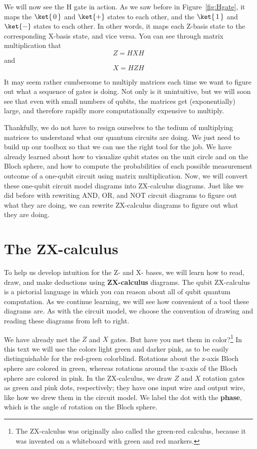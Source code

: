 \documentclass{article}
\theoremstyle{definition}
\newcommand{\kz}[1]{\ket{\,#1\,}}
\newcommand{\kx}[1]{\ket{#1}}
\begin{document}
We will now see the H gate in action.  As we saw before in Figure~\ref{fig:Hgate}, it maps the $\kz0$ and $\kx{+}$ states to each other, and the $\kz1$ and $\kx{-}$ states to each other.  In other words, it maps each Z-basis state to the corresponding X-basis state, and vice versa.
You can see through matrix multiplication that
\begin{equation}
	Z = H X H
\end{equation}
and
\begin{equation}
	X = H Z H
\end{equation}

It may seem rather cumbersome to multiply matrices each time we want to figure out what a sequence of gates is doing.  Not only is it unintuitive, but we will soon see that even with small numbers of qubits, the matrices get (exponentially) large, and therefore rapidly more computationally expensive to multiply.

Thankfully, we do not have to resign ourselves to the tedium of multiplying matrices to understand what our quantum circuits are doing.  We just need to build up our toolbox so that we can use the right tool for the job.  We have already learned about how to visualize qubit states on the unit circle and on the Bloch sphere, and how to compute the probabilities of each possible measurement outcome of a one-qubit circuit using matrix multiplication.  Now, we will convert these one-qubit circuit model diagrams into ZX-calculus diagrams.  Just like we did before with rewriting AND, OR, and NOT circuit diagrams to figure out what they are doing, we can rewrite ZX-calculus diagrams to figure out what they are doing.

\section{The ZX-calculus}
To help us develop intuition for the Z- and X- bases, we will learn how to read, draw, and make deductions using \textbf{ZX-calculus} diagrams.  The qubit ZX-calculus is a pictorial language in which you can reason about all of qubit quantum computation.  As we continue learning, we will see how convenient of a tool these diagrams are.  As with the circuit model, we choose the convention of drawing and reading these diagrams from left to right.

We have already met the $Z$ and $X$ gates.  But have you met them in color?\footnote{The ZX-calculus was originally also called the green-red calculus, because it was invented on a whiteboard with green and red markers.}  In this text we will use the colors light green and darker pink, as to be easily distinguishable for the red-green colorblind.  Rotations about the z-axis Bloch sphere are colored in green, whereas rotations around the x-axis of the Bloch sphere are colored in pink.  In the ZX-calculus, we draw $Z$ and $X$ rotation gates as green and pink dots, respectively; they have one input wire and output wire, like how we drew them in the circuit model.  We label the dot with the \textbf{phase}, which is the angle of rotation on the Bloch sphere.
\end{document}
